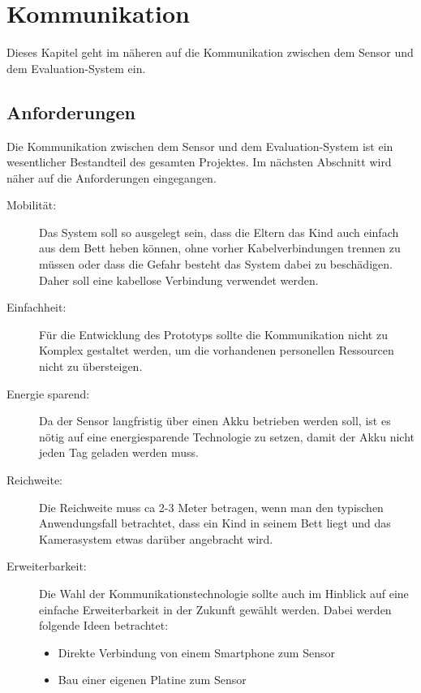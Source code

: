 \section{Kommunikation}
\label{sec:com}

Dieses Kapitel geht im näheren auf die Kommunikation zwischen dem Sensor und dem Evaluation-System ein. 


\subsection{Anforderungen}

Die Kommunikation zwischen dem Sensor und dem Evaluation-System ist ein wesentlicher Bestandteil des gesamten Projektes. Im nächsten Abschnitt wird näher auf die Anforderungen eingegangen.

\begin{description}
  \item[Mobilität:]
  Das System soll so ausgelegt sein, dass die Eltern das Kind auch einfach aus dem Bett heben können, ohne vorher Kabelverbindungen trennen zu müssen oder dass die Gefahr besteht das System dabei zu beschädigen. Daher soll eine kabellose Verbindung verwendet werden.
  
  \item[Einfachheit:]
  Für die Entwicklung des Prototyps sollte die Kommunikation nicht zu Komplex gestaltet werden, um die vorhandenen personellen Ressourcen nicht zu übersteigen. 
  
  \item[Energie sparend:]
  Da der Sensor langfristig über einen Akku betrieben werden soll, ist es nötig auf eine energiesparende Technologie zu setzen, damit der Akku nicht jeden Tag geladen werden muss.
  
  \item[Reichweite:]
  Die Reichweite muss ca 2-3 Meter betragen, wenn man den typischen Anwendungsfall betrachtet, dass ein Kind in seinem Bett liegt und das Kamerasystem etwas darüber angebracht wird.
  
  \item[Erweiterbarkeit:]
  Die Wahl der Kommunikationstechnologie sollte auch im Hinblick auf eine einfache Erweiterbarkeit in der Zukunft gewählt werden. Dabei werden folgende Ideen betrachtet:
  \begin{itemize}
    \item Direkte Verbindung von einem Smartphone zum Sensor
    \item Bau einer eigenen Platine zum Sensor 
  \end{itemize}
   
\end{description}

